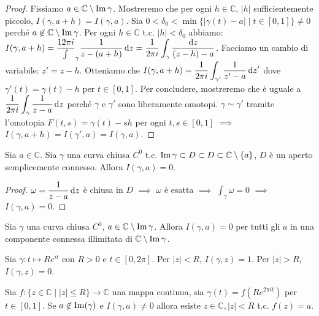 \begin{proof}
  Fissiamo $a \in \mathbb{C}\setminus\operatorname{Im}{\gamma}$. Mostreremo che per ogni $h \in \mathbb{C}$, $|h|$ sufficientemente piccolo, $I(\gamma, a+h)=I(\gamma, a)$. Sia $0<\delta_0<\min\{|\gamma(t)-a| \mid t \in [0,1]\}\not=0$ perché $a \not \in \mathbb{C}\setminus\operatorname{Im}{\gamma}$.
  Per ogni $h \in \mathbb{C}$ t.c. $|h|<\delta_0$ abbiamo: $\displaystyle I(\gamma, a+h)=\frac{1{2\pi i}}\int_{\gamma} \frac{1}{z-(a+h)}\mathop{}\!\mathrm{d} z=\frac{1}{2\pi i} \int_{\gamma} \frac{\mathop{}\!\mathrm{d} z}{(z-h)-a}$. Facciamo un cambio di variabile: $z'=z-h$.
  Otteniamo che $\displaystyle I(\gamma, a+h)=\frac{1}{2\pi i}\int_{\gamma'} \frac{1}{z'-a}\mathop{}\!\mathrm{d} z'$ dove $\gamma'(t)=\gamma(t)-h$ per $t \in [0,1]$.
  Per concludere, mostreremo che è uguale a $\displaystyle \frac{1}{2\pi i}\int_{\gamma} \frac{1}{z-a}\mathop{}\!\mathrm{d} z$ perché $\gamma$ e $\gamma'$ sono liberamente omotopi. $\gamma \sim \gamma'$ tramite l'omotopia $F(t,s)=\gamma(t)-sh$ per ogni $t,s \in [0,1]$ $\implies$ $I(\gamma, a+h)=I(\gamma', a)=I(\gamma, a)$.
\end{proof}

\begin{prop}
  Sia $a \in \mathbb{C}$. Sia $\gamma$ una curva chiusa $C^0$ t.c. $\operatorname{Im}{\gamma} \subset D \subset D \subset \mathbb{C}\setminus\{a\}$, $D$ è un aperto semplicemente connesso. Allora $I(\gamma, a)=0$.
\end{prop}

\begin{proof}
  $\omega=\dfrac{1}{z-a}\mathop{}\!\mathrm{d} z$ è chiusa in $D$ $\implies$ $\omega$ è esatta $\implies$ $\displaystyle \int_{\gamma} \omega=0$ $\implies$ $I(\gamma, a)=0$.
\end{proof}

\begin{exc}
  Sia $\gamma$ una curva chiusa $C^0$, $a \in \mathbb{C}\setminus\operatorname{Im}{\gamma}$. Allora $I(\gamma, a)=0$ per tutti gli $a$ in una componente connessa illimitata di $\mathbb{C}\setminus\operatorname{Im}{\gamma}$.
\end{exc}

\begin{ex}
  Sia $\gamma:t \longmapsto Re^{it}$ con $R>0$ e $t \in [0, 2\pi]$. Per $|z|<R$, $I(\gamma, z)=1$. Per $|z|>R$, $I(\gamma, z)=0$.
\end{ex}

\begin{prop}
  Sia $f:\{z \in \mathbb{C} \mid |z| \le R\} \longrightarrow \mathbb{C}$ una mappa continua, sia $\gamma(t)=f(Re^{2\pi it})$ per $t \in [0,1]$. Se $a \not\in \operatorname{Im}(\gamma)$ e $I(\gamma, a)\not=0$ allora esiste $z \in \mathbb{C}, |z|<R$ t.c. $f(z)=a$.
\end{prop}

